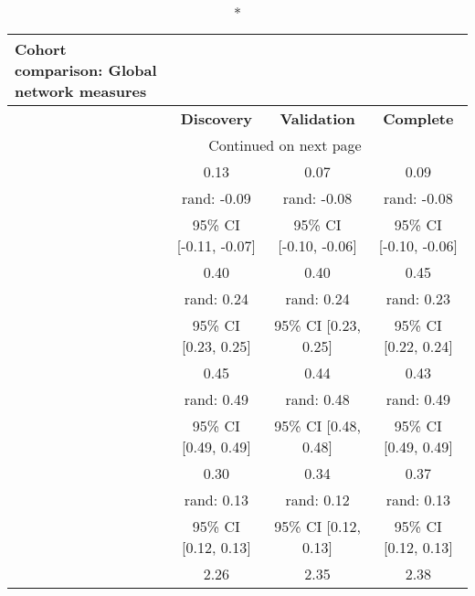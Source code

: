 \documentclass{article}
\begin{document}
\begin{longtable}{lccc}
\caption*{Cohort comparison: Global network measures} \\
\toprule
{} &      \textbf{Discovery} &     \textbf{Validation} &       \textbf{Complete} \\
\midrule
\endhead
\midrule
\multicolumn{3}{r}{{Continued on next page}} \\
\midrule
\endfoot

\bottomrule
\endlastfoot
\rule{0pt}{4ex} \multirow{3}{*}{\textbf{Assortativity}} &                    0.13 &                    0.07 &                    0.09 \\
                                        &             rand: -0.09 &             rand: -0.08 &             rand: -0.08 \\
                                        &  95\% CI [-0.11, -0.07] &  95\% CI [-0.10, -0.06] &  95\% CI [-0.10, -0.06] \\
\rule{0pt}{4ex} \multirow{3}{*}{\textbf{Clustering}}    &                    0.40 &                    0.40 &                    0.45 \\
                                        &              rand: 0.24 &              rand: 0.24 &              rand: 0.23 \\
                                        &    95\% CI [0.23, 0.25] &    95\% CI [0.23, 0.25] &    95\% CI [0.22, 0.24] \\
\rule{0pt}{4ex} \multirow{3}{*}{\textbf{Efficiency}}    &                    0.45 &                    0.44 &                    0.43 \\
                                        &              rand: 0.49 &              rand: 0.48 &              rand: 0.49 \\
                                        &    95\% CI [0.49, 0.49] &    95\% CI [0.48, 0.48] &    95\% CI [0.49, 0.49] \\
\rule{0pt}{4ex} \multirow{3}{*}{\textbf{Modularity}}    &                    0.30 &                    0.34 &                    0.37 \\
                                        &              rand: 0.13 &              rand: 0.12 &              rand: 0.13 \\
                                        &    95\% CI [0.12, 0.13] &    95\% CI [0.12, 0.13] &    95\% CI [0.12, 0.13] \\
\rule{0pt}{4ex} \multirow{3}{*}{\textbf{Shortest Path}} &                    2.26 &                    2.35 &                    2.38 \\

\end{longtable}
\end{document}
